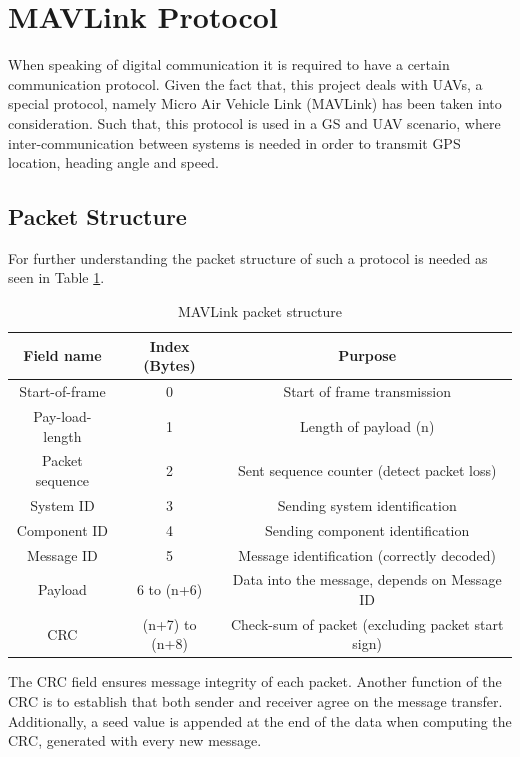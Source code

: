 \section{MAVLink Protocol}\label{sec:mavlink}
When speaking of digital communication it is required to have a certain communication protocol. Given the fact that, this project deals with UAVs, a special protocol, namely Micro Air Vehicle Link (MAVLink) has been taken into consideration. Such that, this protocol is used in a GS and UAV scenario, where inter-communication between systems is needed in order to transmit GPS location, heading angle and speed.  

\subsection{Packet Structure}
For further understanding the packet structure of such a protocol is needed as seen in Table \ref{tab:mavlink}.

\begin{table}[h]
	\centering
	\begin{tabular}{|c||c|c|}
		\hline
		Field name       & Index (Bytes)  & Purpose											     \\ \hline\hline
		Start-of-frame   &      0         & Start of frame transmission 							   \\ \hline
		Pay-load-length  &      1         & Length of payload (n)       							   \\ \hline
		Packet sequence  &      2    	  & Sent sequence counter (detect packet loss)                 \\ \hline
		System ID        & 		3		  & Sending system identification 							   \\ \hline
		Component ID     & 		4 		  & Sending component identification 						   \\ \hline
		Message ID       & 		5 		  & Message identification (correctly decoded)      		   \\ \hline
		Payload          &   6 to (n+6)   & Data into the message, depends on Message ID        	   \\ \hline
		CRC              & (n+7) to (n+8) & Check-sum of packet (excluding packet start sign)          \\ \hline
	\end{tabular}
	\caption{MAVLink packet structure}
	\label{tab:mavlink}
\end{table}

The CRC field ensures message integrity of each packet. Another function of the CRC is to establish that both sender and receiver agree on the message transfer. Additionally, a seed value is appended at the end of the data when computing the CRC, generated with every new message.

